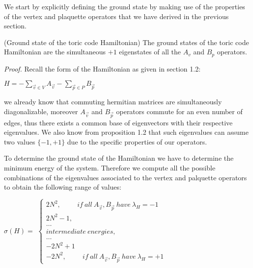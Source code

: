 \documentclass{Configuration_Files/PoliMi3i_thesis}
\begin{document}
We start by explicitly defining the ground state by making use of the properties of the vertex and plaquette operators that we have derived in the previous section.

\begin{proposition} (Ground state of the toric code Hamiltonian) The ground states of the toric code Hamiltonian are the simultaneous $+1$ eigenstates of all the $A_v$ and $B_p$ operators. 
\end{proposition}

\textit{Proof.}\newline 
Recall the form of the Hamiltonian as given in section 1.2:

\begin{center}
	
	$H = -\sum_{\vec{v} \in V}
	A_{\vec{v}} - \sum_{\vec{p} \in P} B_{\vec{p}} $
	
\end{center}

we already know that commuting hermitian matrices are simultaneously diagonalizable, moreover $A_{\vec{v}} $ and $B_{\vec{p}} $ operators commute for an even number of edges, thus there exists a common base of eigenvectors with their respective eigenvalues. We also know from proposition 1.2 that such eigenvalues can assume two values $\{-1,+1\}$ due to the specific properties of our operators.

To determine the ground state of the Hamiltonian we have to determine the minimum energy of the system. Therefore we compute all the possible combinations of the eigenvalues associated to the vertex and palquette operators to obtain the following range of values:

\begin{center}
	$\sigma( H) =$
	$\begin{cases}
		2N^2, \hspace{1cm} if \ all\ A_{\vec{v}} ,B_{\vec{p}}  \ have \ \lambda_{H}= -1\\
		2N^2-1,\\
		\dots\\
		intermediate \ energies,\\
		\dots\\
		-2N^2+1\\
		-2N^2, \hspace{1cm} if \ all \ A_{\vec{v}} ,B_{\vec{p}}  \ have \ \lambda_{H}= +1
	\end{cases}$
	
\end{center}
\end{document}
